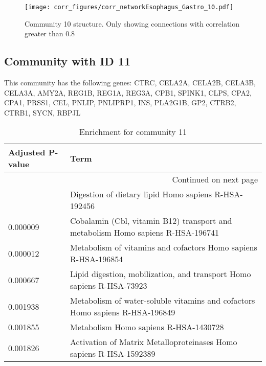 \begin{figure}[h!]
\centering
\texttt{[image: corr\_figures/corr\_networkEsophagus\_Gastro\_10.pdf]}
\caption{Community 10 structure. Only showing connections with correlation greater than 0.8}
\end{figure}




\subsection*{Community with ID 11}
This community has the following genes: CTRC, CELA2A, CELA2B, CELA3B, CELA3A, AMY2A, REG1B, REG1A, REG3A, CPB1, SPINK1, CLPS, CPA2, CPA1, PRSS1, CEL, PNLIP, PNLIPRP1, INS, PLA2G1B, GP2, CTRB2, CTRB1, SYCN, RBPJL
\\
\begin{longtable}{p{2.4cm}p{14.5cm}}
\caption{Enrichment for community 11}\\
\toprule
Adjusted \newline P-value &                                                                             Term \\
\midrule
\endhead
\midrule
\multicolumn{2}{r}{{Continued on next page}} \\
\midrule
\endfoot

\bottomrule
\endlastfoot
                 0.000007 &                             Digestion of dietary lipid Homo sapiens R-HSA-192456 \\
                 0.000009 &  Cobalamin (Cbl, vitamin B12) transport and metabolism Homo sapiens R-HSA-196741 \\
                 0.000012 &                   Metabolism of vitamins and cofactors Homo sapiens R-HSA-196854 \\
                 0.000667 &            Lipid digestion, mobilization, and transport Homo sapiens R-HSA-73923 \\
                 0.001938 &     Metabolism of water-soluble vitamins and cofactors Homo sapiens R-HSA-196849 \\
                 0.001855 &                                            Metabolism Homo sapiens R-HSA-1430728 \\
                 0.001826 &               Activation of Matrix Metalloproteinases Homo sapiens R-HSA-1592389 \\
\end{longtable}


